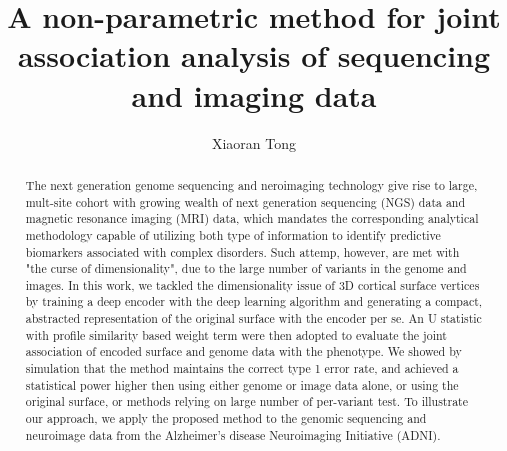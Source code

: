 \documentclass[12pt]{article}
\author{Xiaoran Tong}
\begin{document}
\title{A non-parametric method for joint association analysis of
  sequencing and imaging data}
\maketitle

\begin{abstract}
  The next generation genome sequencing and neroimaging technology
  give rise to large, mult-site cohort with growing wealth of next
  generation sequencing (NGS) data and magnetic resonance imaging
  (MRI) data, which mandates the corresponding analytical methodology
  capable of utilizing both type of information to identify predictive
  biomarkers associated with complex disorders. Such attemp, however,
  are met with "the curse of dimensionality", due to the large number
  of variants in the genome and images. In this work, we tackled the
  dimensionality issue of 3D cortical surface vertices by training a
  deep encoder with the deep learning algorithm and generating a
  compact, abstracted representation of the original surface with the
  encoder per se. An U statistic with profile similarity based weight
  term were then adopted to evaluate the joint association of encoded
  surface and genome data with the phenotype. We showed by simulation
  that the method maintains the correct type 1 error rate, and
  achieved a statistical power higher then using either genome or
  image data alone, or using the original surface, or methods relying
  on large number of per-variant test. To illustrate our approach, we
  apply the proposed method to the genomic sequencing and neuroimage
  data from the Alzheimer's disease Neuroimaging Initiative (ADNI).
\end{abstract}


%

%
%

\printbibheading
\printbibliography
\end{document}
